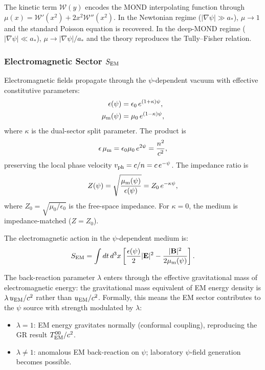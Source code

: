\documentclass[aps,prd,twocolumn,superscriptaddress,floatfix,nofootinbib]{revtex4-2}
\newcommand{\astar}{a_*}
\newcommand{\Wfunc}{\mathcal{W}}
\newcommand{\mufunction}{\mu}
\newcommand{\kap}{\kappa}
\begin{document}
The kinetic term $\Wfunc(y)$ encodes the MOND interpolating function
through $\mufunction(x) = \Wfunc'(x^2) + 2x^2\Wfunc''(x^2)$. In the
Newtonian regime ($|\nabla\psi| \gg \astar$), $\mufunction \to 1$ and the
standard Poisson equation is recovered. In the deep-MOND regime
($|\nabla\psi| \ll \astar$), $\mufunction \to |\nabla\psi|/\astar$ and
the theory reproduces the Tully--Fisher relation.

\subsubsection{Electromagnetic Sector $S_{\rm EM}$}

Electromagnetic fields propagate through the $\psi$-dependent vacuum
with effective constitutive parameters:
\begin{align}
\epsilon(\psi) &= \epsilon_0\,e^{(1+\kap)\psi},
\label{eq:eps-psi}\\
\mu_{\rm m}(\psi) &= \mu_0\,e^{(1-\kap)\psi},
\label{eq:mu-psi}
\end{align}
where $\kap$ is the dual-sector split parameter. The product is
\begin{equation}
\epsilon\,\mu_{\rm m} = \epsilon_0\mu_0\,e^{2\psi} = \frac{n^2}{c^2},
\end{equation}
preserving the local phase velocity $v_{\rm ph} = c/n = c\,e^{-\psi}$.
The impedance ratio is
\begin{equation}
Z(\psi) = \sqrt{\frac{\mu_{\rm m}(\psi)}{\epsilon(\psi)}}
= Z_0\,e^{-\kap\psi},
\end{equation}
where $Z_0 = \sqrt{\mu_0/\epsilon_0}$ is the free-space impedance.
For $\kap = 0$, the medium is impedance-matched ($Z = Z_0$).

The electromagnetic action in the $\psi$-dependent medium is:
\begin{equation}
S_{\rm EM} = \int dt\,d^3x\left[
  \frac{\epsilon(\psi)}{2}|\mathbf{E}|^2
  - \frac{|\mathbf{B}|^2}{2\mu_{\rm m}(\psi)}
\right].
\label{eq:S-EM}
\end{equation}

The back-reaction parameter $\lambda$ enters through the effective
gravitational mass of electromagnetic energy: the gravitational mass
equivalent of EM energy density is $\lambda\,u_{\rm EM}/c^2$ rather
than $u_{\rm EM}/c^2$. Formally, this means the EM sector contributes
to the $\psi$ source with strength modulated by $\lambda$:
\begin{itemize}[nosep]
\item $\lambda = 1$: EM energy gravitates normally (conformal coupling),
  reproducing the GR result $T^{00}_{\rm EM}/c^2$.
\item $\lambda \neq 1$: anomalous EM back-reaction on $\psi$; laboratory
  $\psi$-field generation becomes possible.
\end{itemize}
\end{document}
